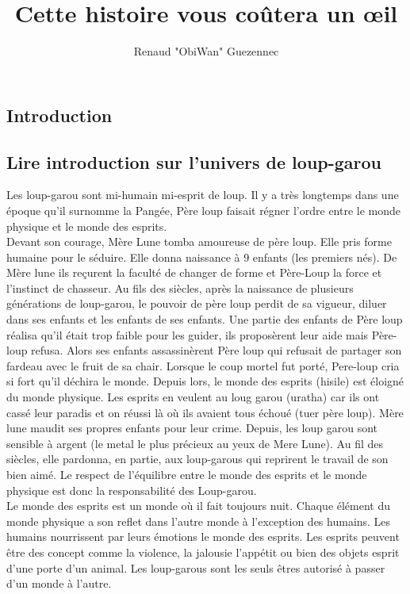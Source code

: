\documentclass[oneside,12pt]{book}
\title{Cette histoire vous coûtera un œil}
\author{Renaud "ObiWan" Guezennec}
\date{}
\begin{document}
\maketitle \clearpage
\tableofcontents \clearpage

\begin{flushleft}
    \chapter{Introduction}
        \section{Lire introduction sur l'univers de loup-garou}
       Les loup-garou sont mi-humain mi-esprit de loup. 
       Il y a très longtemps dans une époque qu'il surnomme la Pangée, Père loup faisait régner l'ordre entre le monde physique et le monde des esprits.\\ 
       Devant son courage, Mère Lune tomba amoureuse de père loup. 
       Elle pris forme humaine pour le séduire. Elle donna naissance à 9 enfants (les premiers nés). 
       De Mère lune ils reçurent la faculté de changer de forme et Père-Loup la force et l'instinct de chasseur. Au fils des siècles, après la naissance de plusieurs générations de loup-garou, le pouvoir de père loup perdit de sa vigueur, diluer dans ses enfants et les enfants de ses enfants. 
       Une partie des enfants de Père loup réalisa qu'il était trop faible pour les guider, ils proposèrent leur aide mais Père-loup refusa. Alors ses enfants assassinèrent Père loup  qui refusait de partager son fardeau avec le fruit de sa chair. Lorsque le coup mortel fut porté, Pere-loup cria si fort qu'il déchira le monde. Depuis lors, le monde des esprits (hisile) est éloigné du monde physique. Les esprits en veulent au loug garou (uratha) car ils ont cassé leur paradis et on réussi là où ils avaient tous échoué (tuer père loup). Mère lune maudit ses propres enfants pour leur crime. Depuis, les loup garou sont sensible à argent (le metal le plus précieux au yeux de Mere Lune). Au fil des siècles, elle pardonna, en partie, aux loup-garous qui reprirent le travail de son bien aimé. Le respect de l'équilibre entre le monde des esprits et le monde physique est donc la responsabilité des Loup-garou. \\
Le monde des esprits est un monde où il fait toujours nuit. Chaque élément du monde physique a son reflet dans l'autre monde à l'exception des humains. Les humains nourrissent par leurs émotions le monde des esprits. Les esprits peuvent être des concept comme la violence, la jalousie l'appétit ou bien des objets esprit d'une porte d'un animal. Les loup-garous sont les seuls êtres autorisé à passer d'un monde à l'autre. \\

\end{flushleft}
\end{document}
